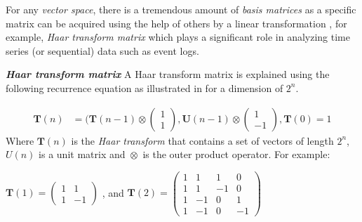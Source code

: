 For any \textit{vector space}, there is a tremendous amount of \textit{basis matrices} as a specific matrix can be acquired using the help of others by a linear transformation \cite{strang1993introduction}, for example, \textit{Haar transform matrix} which plays a significant role in analyzing time series (or sequential) data \cite{santoso1997power} such as event logs.

\newcommand{\tens}[1]{%
	\mathbin{\mathop{\otimes}\limits_{#1}}%
}

\begin{definition}{\textit{\textbf{Haar transform matrix}}}
	A Haar transform matrix is explained using the following recurrence equation as illustrated in \cite{rao1976orthogonal} for a dimension of $2^n$. 
	
	
	\begin{equation} \label{eq3}
	\begin{split}
	\textbf{T}(n) & = (\textbf{T}(n-1) \tens{} \begin{pmatrix}
	1  \\
	1
	\end{pmatrix}, \textbf{U}(n-1) \tens{} \begin{pmatrix}
	1  \\
	-1
	\end{pmatrix}, \textbf{T}(0)=1
	\end{split}
	\end{equation}
Where $\textbf{T}(n)$ is the \textit{Haar transform} that contains a set of vectors of length $2^n$, $\textit{U}(n)$ is a unit matrix  and $\tens{}$ is the outer product operator. For example: 

\begin{center}
	$\textbf{T}(1) = \begin{pmatrix}
	1 & 1  \\
	1 & -1
	\end{pmatrix}$
	,  and 
	$\textbf{T}(2) = \begin{pmatrix}
	1 & 1 & 1 & 0 \\
	1 & 1 & -1 & 0 \\
	1 & -1 & 0 & 1 \\
	1 & -1 & 0 & -1 

	\end{pmatrix}$
\end{center}	
	
\end{definition}


